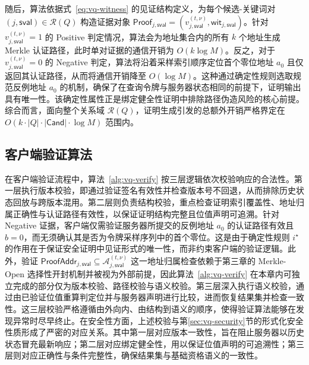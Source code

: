 随后，算法依据式~\eqref{eq:vq-witness} 的见证结构定义，为每个候选-关键词对 $(j,\mathsf{sval})\in\mathcal{R}(Q)$ 构造证据对象 $\mathsf{Proof}_{j,\mathsf{sval}}=(v_{j,\mathsf{sval}}^{(t,\nu)},\mathsf{wit}_{j,\mathsf{sval}})$。针对 $v_{j,\mathsf{sval}}^{(t,\nu)}=1$ 的 Positive 判定情况，算法会为地址集合内的所有 $k$ 个地址生成 Merkle 认证路径，此时单对证据的通信开销为 $O(k\log M)$。反之，对于 $v_{j,\mathsf{sval}}^{(t,\nu)}=0$ 的 Negative 判定，算法将沿着采样索引顺序定位首个零位地址 $a_0$ 且仅返回其认证路径，从而将通信开销降至 $O(\log M)$。这种通过确定性规则选取规范反例地址 $a_0$ 的机制，确保了在查询令牌与服务器状态相同的前提下，证明输出具有唯一性。该确定性属性正是绑定健全性证明中排除路径伪造风险的核心前提。综合而言，面向整个关系域 $\mathcal{R}(Q)$，证明生成引发的总额外开销严格界定在 $O(k\cdot|Q|\cdot|\mathsf{Cand}|\cdot\log M)$ 范围内。

\subsection{客户端验证算法}
在客户端验证流程中，算法~\ref{alg:vq-verify} 按三层逻辑依次校验响应的合法性。第一层执行版本校验，即通过验证签名有效性并检查版本号不回退，从而排除历史状态回放与跨版本混用。第二层则负责结构校验，重点检查证明索引覆盖性、地址归属正确性与认证路径有效性，以保证证明结构完整且位值声明可追溯。针对 Negative 证据，客户端仅需验证服务器所提交的反例地址 $a_0$ 的认证路径有效且 $b=0$，而无须确认其是否为令牌采样序列中的首个零位。这是由于确定性规则 $i^\star$ 的作用在于保证安全证明中见证形式的唯一性，而非约束客户端的验证逻辑。此外，验证 $\mathsf{ProofAddr}_{j,\mathsf{sval}}\subseteq\mathcal{A}_{j,\mathsf{sval}}^{(t,\nu)}$ 这一地址归属检查依赖于第三章的 Merkle-Open 选择性开封机制并被视为外部前提，因此算法~\ref{alg:vq-verify} 在本章内可独立完成的部分仅为版本校验、路径校验与语义校验。第三层深入执行语义校验，通过由已验证位值重算判定位并与服务器声明进行比较，进而恢复结果集并检查一致性。这三层校验严格遵循由外向内、由结构到语义的顺序，使得验证算法能够在发现异常时尽早终止。在安全性方面，上述校验与第\ref{sec:vq-security}节的形式化安全性质形成了严密的对应关系。其中第一层对应版本一致性，旨在阻止服务器以历史状态冒充最新响应；第二层对应绑定健全性，用以保证位值声明的可追溯性；第三层则对应正确性与条件完整性，确保结果集与基础资格语义的一致性。

